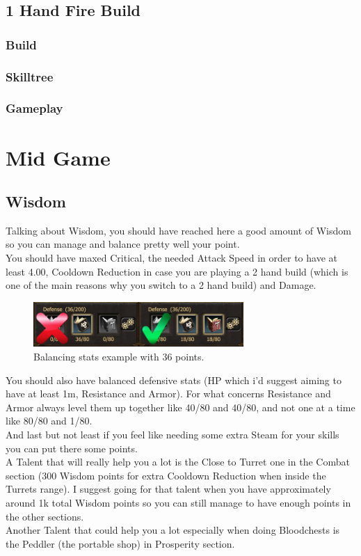 \documentclass[12pt]{article}
\begin{document}

\subsection{1 Hand Fire Build}
\subsubsection{Build}
\subsubsection{Skilltree}
\subsubsection{Gameplay}

\newpage


\section{Mid Game}

\subsection{Wisdom}
Talking about Wisdom, you should have reached here a good amount of Wisdom so you can manage and balance pretty well your point. \\
You should have maxed Critical, the needed Attack Speed in order to have at least 4.00, Cooldown Reduction in case you are playing a 2 hand build (which is one of the main reasons why you switch to a 2 hand build) and Damage.

\begin{figure}
    \includegraphics[width=8cm]{wisdom/wisdom_example.png}
    \caption{Balancing stats example with 36 points.}
    \centering
\end{figure}
You should also have balanced defensive stats (HP which i'd suggest aiming to have at least 1m, Resistance and Armor). For what concerns Resistance and Armor always level them up together like 40/80 and 40/80, and not one at a time like 80/80 and 1/80. \\
And last but not least if you feel like needing some extra Steam for your skills you can put there some points. \\
A Talent that will really help you a lot is the Close to Turret one in the Combat section (300 Wisdom points for extra Cooldown Reduction when inside the Turrets range). I suggest going for that talent when you have approximately around 1k total Wisdom points so you can still manage to have enough points in the other sections. \\
Another Talent that could help you a lot especially when doing Bloodchests is the Peddler (the portable shop) in Prosperity section.
\end{document}

